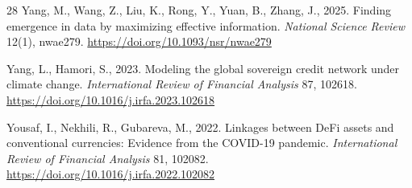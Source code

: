\documentclass[12pt]{article}
\begin{document}
\begin{thebibliography}{28}
Yang, M., Wang, Z., Liu, K., Rong, Y., Yuan, B., Zhang, J., 2025.
\newblock Finding emergence in data by maximizing effective information.
\newblock \emph{National Science Review} 12(1), nwae279. \url{https://doi.org/10.1093/nsr/nwae279}

Yang, L., Hamori, S., 2023.
\newblock Modeling the global sovereign credit network under climate change.
\newblock \emph{International Review of Financial Analysis} 87, 102618. \url{https://doi.org/10.1016/j.irfa.2023.102618}

Yousaf, I., Nekhili, R., Gubareva, M., 2022.
\newblock Linkages between DeFi assets and conventional currencies: Evidence from the COVID-19 pandemic.
\newblock \emph{International Review of Financial Analysis} 81, 102082. \url{https://doi.org/10.1016/j.irfa.2022.102082}
\end{thebibliography}
\end{document}
